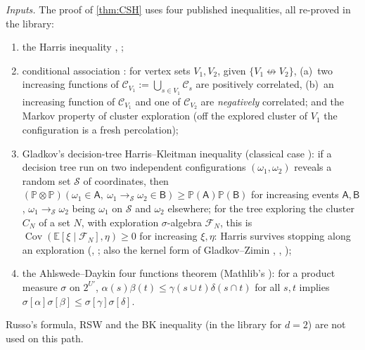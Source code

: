 \documentclass[11pt]{article}
\theoremstyle{definition}
\theoremstyle{remark}
\newcommand{\PP}{\mathbb{P}}
\newcommand{\E}{\mathbb{E}}
\DeclareMathOperator{\Cov}{Cov}
\newcommand{\ncon}{\nleftrightarrow}
\newcommand{\eC}{\mathcal{C}}
\begin{document}
\emph{Inputs.}  The proof of \cref{thm:CSH} uses four published inequalities, all re-proved in the library:
\begin{enumerate}[label=\textup{(K\arabic*)},leftmargin=2.6em,itemsep=0pt,topsep=2pt]
\item\label{K1} the Harris inequality \citep{HarrisPCPS1960}, \citep[Thm.~(2.4)]{GrimmettPercolation1999};
\item\label{K2} conditional association \citep[Thms.~1.3--1.5, Remark~1]{VandenbergHaggstromKahn2005}: for vertex sets $V_1,V_2$, given
 $\{V_1\ncon V_2\}$, (a)~two increasing functions of $\eC_{V_1}:=\bigcup_{s\in V_1}\eC_s$ are positively correlated, (b)~an increasing function
 of $\eC_{V_1}$ and one of $\eC_{V_2}$ are \emph{negatively} correlated; and the Markov property of cluster exploration
 \citep[Lemmas~2.3--2.4]{VandenbergHaggstromKahn2005} (off the explored cluster of $V_1$ the configuration is a fresh percolation);
\item\label{K3} Gladkov's decision-tree Harris--Kleitman inequality \citep[Thm.~3.2]{Gladkov2024} (classical case
 \citep{HarrisPCPS1960,Kleitman1966}): if a decision tree run on two independent configurations $(\omega_1,\omega_2)$ reveals a random set
 $\mathcal S$ of coordinates, then $(\PP\otimes\PP)(\omega_1\in\mathsf A,\ \omega_1\!\to_{\mathcal S}\omega_2\in\mathsf B)\ge\PP(\mathsf A)\PP(\mathsf B)$
 for increasing events $\mathsf A,\mathsf B$, $\omega_1\!\to_{\mathcal S}\omega_2$ being $\omega_1$ on $\mathcal S$ and $\omega_2$ elsewhere; for the
 tree exploring the cluster $C_N$ of a set $N$, with exploration $\sigma$-algebra $\mathcal F_N$, this is $\Cov(\E[\xi\mid\mathcal F_N],\eta)\ge0$
 for increasing $\xi,\eta$: Harris survives stopping along an exploration (,
 ; also the kernel form of Gladkov--Zimin \citep[Ch.~5]{Gladkov2025Thesis}, \citep{GladkovZimin2024HK},
 );
\item\label{K4} the Ahlswede--Daykin four functions theorem \citep{AhlswedeDaykin1978} (Mathlib's ): for a
 product measure $\sigma$ on $2^{U'}$, $\alpha(s)\beta(t)\le\gamma(s\cup t)\delta(s\cap t)$ for all $s,t$ implies
 $\sigma[\alpha]\sigma[\beta]\le\sigma[\gamma]\sigma[\delta]$.
\end{enumerate}
Russo's formula, RSW and the BK inequality (in the library for $d=2$) are not used on this path.
\end{document}
